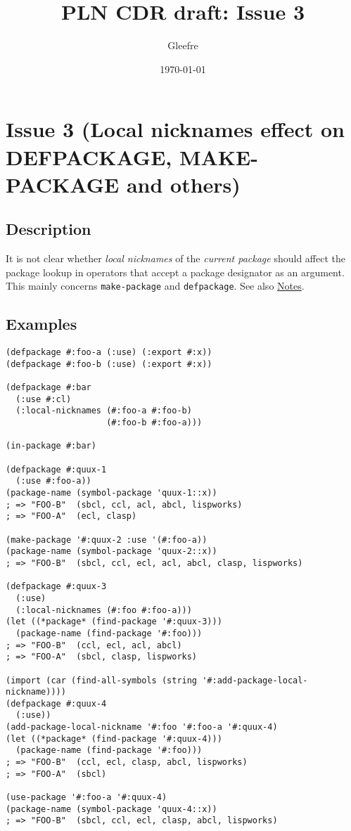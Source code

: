 \documentclass[11pt]{article}
\author{Gleefre}
\date{\today}
\title{PLN CDR draft: Issue 3}
\begin{document}
\maketitle

\section{Issue 3 (Local nicknames effect on DEFPACKAGE, MAKE-PACKAGE and others)}
\label{sec:orgf5815aa}
\subsection{Description}
\label{sec:org46df707}
It is not clear whether \emph{local nicknames} of the \emph{current package} should affect
the package lookup in operators that accept a package designator as an argument.
This mainly concerns \texttt{make-package} and \texttt{defpackage}.
See also \hyperref[sec:org8aaf4cf]{Notes}.
\subsection{Examples}
\label{sec:org8d8b84e}
\begin{verbatim}
(defpackage #:foo-a (:use) (:export #:x))
(defpackage #:foo-b (:use) (:export #:x))

(defpackage #:bar
  (:use #:cl)
  (:local-nicknames (#:foo-a #:foo-b)
                    (#:foo-b #:foo-a)))

(in-package #:bar)

(defpackage #:quux-1
  (:use #:foo-a))
(package-name (symbol-package 'quux-1::x))
; => "FOO-B"  (sbcl, ccl, acl, abcl, lispworks)
; => "FOO-A"  (ecl, clasp)

(make-package '#:quux-2 :use '(#:foo-a))
(package-name (symbol-package 'quux-2::x))
; => "FOO-B"  (sbcl, ccl, ecl, acl, abcl, clasp, lispworks)

(defpackage #:quux-3
  (:use)
  (:local-nicknames (#:foo #:foo-a)))
(let ((*package* (find-package '#:quux-3)))
  (package-name (find-package '#:foo)))
; => "FOO-B"  (ccl, ecl, acl, abcl)
; => "FOO-A"  (sbcl, clasp, lispworks)

(import (car (find-all-symbols (string '#:add-package-local-nickname))))
(defpackage #:quux-4
  (:use))
(add-package-local-nickname '#:foo '#:foo-a '#:quux-4)
(let ((*package* (find-package '#:quux-4)))
  (package-name (find-package '#:foo)))
; => "FOO-B"  (ccl, ecl, clasp, abcl, lispworks)
; => "FOO-A"  (sbcl)

(use-package '#:foo-a '#:quux-4)
(package-name (symbol-package 'quux-4::x))
; => "FOO-B"  (sbcl, ccl, ecl, clasp, abcl, lispworks)
\end{verbatim}
\end{document}
